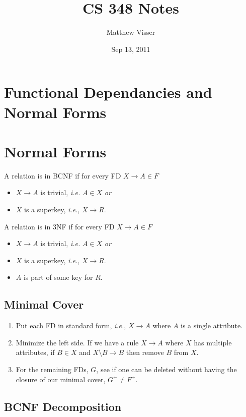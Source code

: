 \documentclass[12pt]{article}
\begin{document}
\newtheorem{mydef}{Definition}

\title{CS 348 Notes}
\author{Matthew Visser}
\date{Sep 13, 2011}
\maketitle

\section{Functional Dependancies and Normal Forms}

\section{Normal Forms}

A relation is in BCNF if for every FD $X \to A \in F$
\begin{itemize}
	\item $X \to A$ is trivial, \textit{i.e.} $A \in X$ \emph{or}
	\item $X$ is a superkey, \textit{i.e.}, $X \to R$.
\end{itemize}

A relation is in 3NF if for every FD $X \to A \in F$
\begin{itemize}
	\item $X \to A$ is trivial, \textit{i.e.} $A \in X$ \emph{or}
	\item $X$ is a superkey, \textit{i.e.}, $X \to R$.
	\item $A$ is part of some key for $R$.
\end{itemize}

\subsection{Minimal Cover}

\begin{enumerate}
	\item Put each FD in standard form, \textit{i.e.}, $X \to A$ where $A$ is a
		single attribute.
	\item Minimize the left side. If we have a rule $X \to A$ where $X$ has
		multiple attributes, if $B \in X$ and $X \setminus B \to B$ then remove
		$B$ from $X$.
	\item For the remaining FDs, $G$, see if one can be deleted without having
		the closure of our minimal cover, $G^+ \neq F^+$.
\end{enumerate}

\subsection{BCNF Decomposition}
\end{document}
